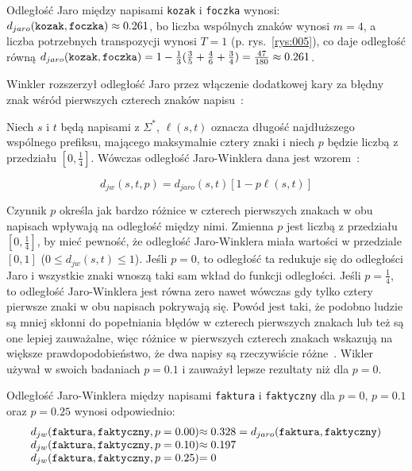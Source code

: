\documentclass{praca1}
\begin{document}
\begin{example}
Odległość Jaro między napisami \verb|kozak| i \verb|foczka| wynosi: $d_{jaro}(\verb|kozak|, \verb|foczka|)  \approx 0.261$, bo liczba wspólnych znaków wynosi $m = 4$, a liczba potrzebnych transpozycji wynosi $T = 1$ (p. rys.~\ref{rys:005}), co daje odległość równą $d_{jaro}(\verb|kozak|, \verb|foczka|) = 1 - \frac{1}{3}(\frac{3}{5} + \frac{4}{6} + \frac{3}{4}) = \frac{47}{180} \approx 0.261$.
\end{example}

Winkler rozszerzył odległość Jaro przez włączenie dodatkowej kary za błędny znak wśród pierwszych czterech znaków napisu~\cite{Loo2014:stringdist}:

\begin{definition}
Niech $s$ i $t$ będą napisami z $\Sigma^*$, $\ell(s,t)$ oznacza długość najdłuższego wspólnego prefiksu, mającego maksymalnie cztery znaki i niech $p$ będzie liczbą z przedziału $[0, \frac{1}{4}]$. Wówczas odległość Jaro-Winklera dana jest wzorem~\cite{Winkler1990:stringcomparator}:

\begin{equation}
\label{eq:012}
d_{jw}(s,t, p) = d_{jaro}(s,t)[1 - p\ell(s,t)]
\end{equation}
\end{definition}

Czynnik $p$ określa jak bardzo różnice w czterech pierwszych znakach w obu napisach wpływają na odległość między nimi. Zmienna $p$ jest liczbą z przedziału $[0, \frac{1}{4}]$, by mieć pewność, że odległość Jaro-Winklera miała wartości w przedziale $[0,1]$ ($0 \leq d_{jw}(s,t) \leq 1$). Jeśli $p=0$, to odległość ta redukuje się do odległości Jaro i wszystkie znaki wnoszą taki sam wkład do funkcji odległości. Jeśli $p = \frac{1}{4}$, to odległość Jaro-Winklera jest równa zero nawet wówczas gdy tylko cztery pierwsze znaki w obu napisach pokrywają się. Powód jest taki, że podobno ludzie są mniej skłonni do popełniania błędów w czterech pierwszych znakach lub też są one lepiej zauważalne, więc różnice w pierwszych czterech znakach wskazują na większe prawdopodobieństwo, że dwa napisy są rzeczywiście różne~\cite{Loo2014:stringdist}. Wikler~\cite{Winkler1990:stringcomparator} używał w swoich badaniach $p = 0.1$ i zauważył lepsze rezultaty niż dla $p = 0$.

\begin{example}
Odległość Jaro-Winklera między napisami \verb|faktura| i \verb|faktyczny| dla $p = 0$, $p = 0.1$ oraz $p = 0.25$ wynosi odpowiednio: 
\begin{equation*}
  \left.\begin{array}{l@{}l}
    d_{jw}(\verb|faktura|, \verb|faktyczny|, p = 0.00) & \approx 0.328 = d_{jaro}(\verb|faktura|, \verb|faktyczny|) \\
    d_{jw}(\verb|faktura|, \verb|faktyczny|, p = 0.10) & \approx 0.197  \\
    d_{jw}(\verb|faktura|, \verb|faktyczny|, p = 0.25) & =  0
  \end{array}\right.
\end{equation*}
\end{example}
\end{document}

